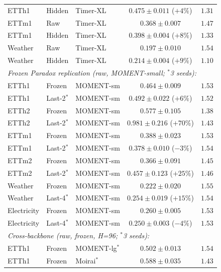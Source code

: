 \documentclass{article}
\begin{document}
\begin{table}[!htbp]
\begin{tabular}{@{}lllcc@{}}
ETTh1       & Hidden  & Timer-XL & $0.475 \pm 0.011$ {\scriptsize($+4\%$)} & $1.31$ \\
ETTm1       & Raw     & Timer-XL & $\mathbf{0.368 \pm 0.007}$ & $1.47$ \\
ETTm1       & Hidden  & Timer-XL & $0.398 \pm 0.004$ {\scriptsize($+8\%$)} & $1.33$ \\
Weather     & Raw     & Timer-XL & $\mathbf{0.197 \pm 0.010}$ & $1.54$ \\
Weather     & Hidden  & Timer-XL & $0.214 \pm 0.004$ {\scriptsize($+9\%$)} & $1.10$ \\
\midrule
\multicolumn{5}{l}{\textit{Frozen Paradox replication (raw, MOMENT-small; $^{\ast}$3 seeds):}} \\
ETTh1       & Frozen  & MOMENT-sm & $\mathbf{0.464 \pm 0.009}$ & $1.53$ \\
ETTh1       & Last-2$^{\ast}$  & MOMENT-sm & $0.492 \pm 0.022$ {\scriptsize($+6\%$)} & $1.52$ \\
ETTh2       & Frozen  & MOMENT-sm & $\mathbf{0.577 \pm 0.105}$ & $1.38$ \\
ETTh2       & Last-2$^{\ast}$  & MOMENT-sm & $0.981 \pm 0.216$ {\scriptsize($+70\%$)} & $1.43$ \\
ETTm1       & Frozen  & MOMENT-sm & $0.388 \pm 0.023$ & $1.53$ \\
ETTm1       & Last-2$^{\ast}$  & MOMENT-sm & $\mathbf{0.378 \pm 0.010}$ {\scriptsize($-3\%$)} & $1.54$ \\
ETTm2       & Frozen  & MOMENT-sm & $\mathbf{0.366 \pm 0.091}$ & $1.45$ \\
ETTm2       & Last-2$^{\ast}$  & MOMENT-sm & $0.457 \pm 0.123$ {\scriptsize($+25\%$)} & $1.46$ \\
Weather     & Frozen  & MOMENT-sm & $\mathbf{0.222 \pm 0.020}$ & $1.55$ \\
Weather     & Last-4$^{\ast}$  & MOMENT-sm & $0.254 \pm 0.019$ {\scriptsize($+15\%$)} & $1.54$ \\
Electricity & Frozen  & MOMENT-sm & $0.260 \pm 0.005$ & $1.53$ \\
Electricity & Last-4$^{\ast}$  & MOMENT-sm & $\mathbf{0.250 \pm 0.003}$ {\scriptsize($-4\%$)} & $1.53$ \\
\midrule
\multicolumn{5}{l}{\textit{Cross-backbone (raw, frozen, H=96; $^{\ast}$3 seeds):}} \\
ETTh1   & Frozen  & MOMENT-lg$^{\ast}$ & $0.502 \pm 0.013$ & $1.54$ \\
ETTh1   & Frozen  & Moirai$^{\ast}$    & $0.588 \pm 0.035$ & $1.43$ \\

\end{tabular}
\end{table}
\end{document}
